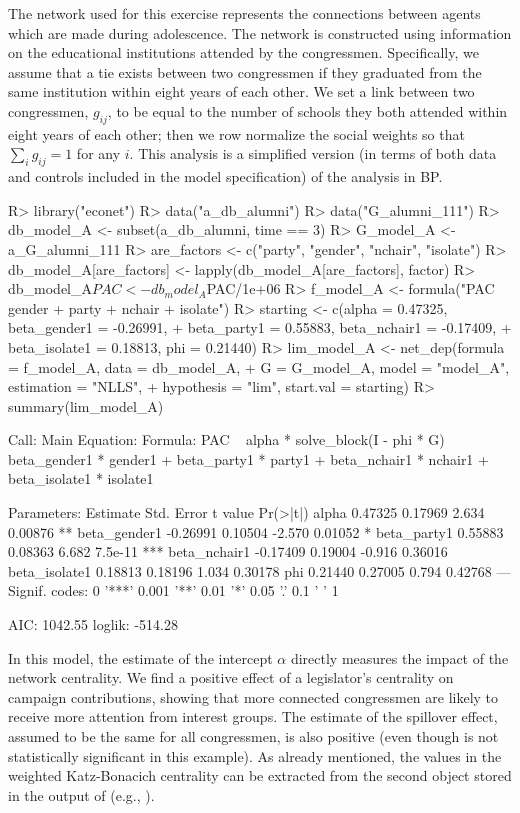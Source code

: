 \documentclass[nojss]{jss}
\begin{document}
The network used for this exercise represents the connections between agents which are made during adolescence. The network is constructed using information on the educational institutions attended by the congressmen. Specifically, we assume that a tie exists between two congressmen if they graduated from the same institution within eight years of each other. We set a link between two congressmen, $g_{ij}$, to be equal to the number of schools they both attended within eight years of each other; then we row normalize the social weights so that $\sum_{i}g_{ij}=1$ for any $i$. This analysis is a simplified version (in terms of both data and controls included in the model specification) of the analysis in BP.
\begin{CodeChunk}
\begin{CodeInput}
R> library("econet")
R> data("a_db_alumni")
R> data("G_alumni_111")
R> db_model_A <- subset(a_db_alumni, time == 3)
R> G_model_A <- a_G_alumni_111
R> are_factors <- c("party", "gender", "nchair", "isolate")
R> db_model_A[are_factors] <- lapply(db_model_A[are_factors], factor)
R> db_model_A$PAC <- db_model_A$PAC/1e+06
R> f_model_A <- formula("PAC ~ gender + party + nchair + isolate")
R> starting <- c(alpha = 0.47325, beta_gender1 = -0.26991,
+    beta_party1 = 0.55883, beta_nchair1 = -0.17409,
+    beta_isolate1 = 0.18813, phi = 0.21440)
R> lim_model_A <- net_dep(formula = f_model_A, data = db_model_A,
+    G = G_model_A, model = "model_A", estimation = "NLLS",
+    hypothesis = "lim", start.val = starting)
R> summary(lim_model_A)
\end{CodeInput}
\begin{CodeOutput}
Call:
Main Equation:  
Formula: PAC ~ alpha * solve_block(I - phi * G) %
beta_gender1 * gender1 + beta_party1 * party1 + 
beta_nchair1 * nchair1 + beta_isolate1 * isolate1

Parameters:
Estimate Std. Error t value Pr(>|t|)    
alpha          0.47325    0.17969   2.634  0.00876 ** 
beta_gender1  -0.26991    0.10504  -2.570  0.01052 *  
beta_party1    0.55883    0.08363   6.682  7.5e-11 ***
beta_nchair1  -0.17409    0.19004  -0.916  0.36016    
beta_isolate1  0.18813    0.18196   1.034  0.30178    
phi            0.21440    0.27005   0.794  0.42768    
---
Signif. codes:  0 '***' 0.001 '**' 0.01 '*' 0.05 '.' 0.1 ' ' 1

AIC: 1042.55  loglik: -514.28
\end{CodeOutput}
\end{CodeChunk}
In this model, the estimate of the intercept $\alpha$ directly measures the impact of the network centrality. We find a positive effect of a legislator's centrality on campaign contributions, showing that more connected congressmen are likely to receive more attention from interest groups. The estimate of the spillover effect, assumed to be the same for all congressmen, is also positive (even though is not statistically significant in this example).
As already mentioned, the values in the weighted Katz-Bonacich centrality can be extracted from the second object stored in the output of  (e.g., ).
\end{document}
